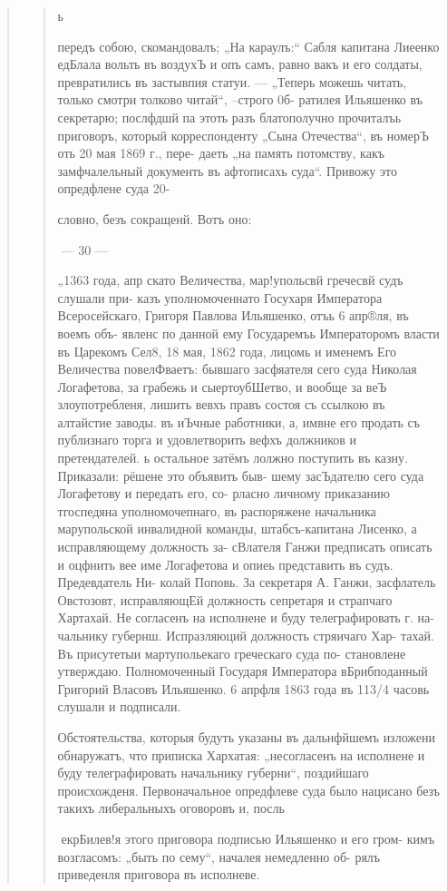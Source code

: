 \begin{quote}
\begin{quote}
ь

передъ собою, скомандовалъ; „На караулъ:“ Сабля капитана
Лиеенко едБлала вольть въ воздухЪ и опъ самъ, равно вакъ
и его солдаты, превратились въ застывпия статуи. — „Теперь
можешь читать, только смотри толково читай“, --строго 0б-
ратилея Ильяшенко въ секретарю; послфдшй па этоть разъ
блатополучно прочиталъь приговоръ, который корреспонденту
„Сына Отечества“, въ номерЪ оть 20 мая 1869 г., пере-
даеть „на память потомству, какъ замфчалельный документь
въ афтописахь суда“. Привожу это опредфлене суда 20-

словно, безъ сокращенй. Вотъ оно:

— 30 —

„1363 года, апр%
скато Величества, мар!упольсвй гречесвй судъ слушали при-
казъ уполномоченнато Госухаря Императора Всеросейскаго,
Григоря Павлова Ильяшенко, отъь 6 апр®ля, въ воемъ объ-
явленс по данной ему Государемъь Императоромъ власти въ
Царекомъ Сел8, 18 мая, 1862 года, лицомь и именемъ
Его Величества повелФваетъ: бывшаго засфяателя сего суда
Николая Логафетова, за грабежь и сыертоубШетво, и вообще
за веЪ злоупотребленя, лишить вевхъ правъ состоя съ
ссылкою въ алтайстие заводы. въ иЪчные работники, а, имвне
его продать съ публизнаго торга и удовлетворить вефхъ
должников и претендателей. ь остальное затёмъ лолжно
поступить въ казну. Приказали: рёшене это объявить быв-
шему засЪдателю сего суда Логафетову и передать его, со-
рласно личному приказанию тгоспедяна уполномочепнаго, въ
распоряжене начальника марупольской инвалидной команды,
штабсъ-капитана Лисенко, а исправляющему должность за-
сВлателя Ганжи предписать описать и оцфнить вее име
Логафетова и опиеь представить въ судъ. Предевдатель Ни-
колай Поповь. За секретаря А. Ганжи, засфлатель Овстозовт,
исправляющЕй должность сепретаря и страпчаго Хартахай.
Не согласенъ на исполнене и буду телеграфировать г. на-
чальнику губернш. Испразляюций должность стряичаго Хар-
тахай. Въ присутетыи мартупольекаго греческаго суда по-
становлене утверждаю. Полномоченный Государя Императора
вБрибподанный Григорий Власовъ Ильяшенко. 6 апрфля 1863
года въ 113/4 часовь слушали и подписали.

Обстоятельства, которыя будуть указаны въ дальнфйшемъ
изложени обнаружатъ, что приписка Хархатая: „несогласенъ
на исполнене и буду телеграфировать начальнику губерни“,
поздийшаго происхожденя. Первоначальное опредфлеве суда
было нацисано безъ такихъ либеральныхъ оговоровъ и, посль

екрБилев!я этого приговора подписью Ильяшенко и его гром-
кимъ возгласомъ: „быть по сему“, началея немедленно об-
рялъ приведенля приговора въ исполневе.


\end{quote}
\end{quote}
